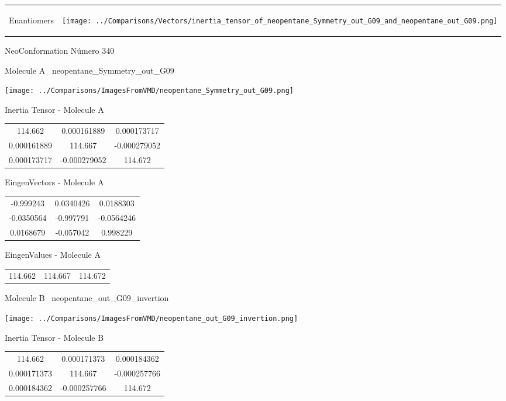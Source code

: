 \vtab[-5mm]
\begin{tabular}{*{2}{m{}}}
\begin{center}
\textcolor{NavyBlue}{\Large Enantiomers}
\end{center}
&
\begin{center}
\texttt{[image: ../Comparisons/Vectors/inertia\_tensor\_of\_neopentane\_Symmetry\_out\_G09\_and\_neopentane\_out\_G09.png]}
\end{center}
\end{tabular}

 \newpage

\vtab[-3cm]
\begin{center}
{\large NeoConformation \tab Número 340}
\end{center}
\begin{multicols}{2}
\begin{center}

Molecule A \
neopentane\_Symmetry\_out\_G09

\texttt{[image: ../Comparisons/ImagesFromVMD/neopentane\_Symmetry\_out\_G09.png]}

Inertia Tensor - Molecule A \\
\begin{tabular}{|c c c|}
114.662	 & 	0.000161889	 & 	0.000173717	 \\
0.000161889	 & 	114.667	 & 	-0.000279052	 \\
0.000173717	 & 	-0.000279052	 & 	114.672
\end{tabular}

\vtab
 EingenVectors - Molecule A     \\
\begin{tabular}{|c c c|}
-0.999243	 & 	0.0340426	 & 	0.0188303	 \\
-0.0350564	 & 	-0.997791	 & 	-0.0564246	 \\
0.0168679	 & 	-0.057042	 & 	0.998229
\end{tabular}

\vtab
 EingenValues - Molecule A     \\
\begin{tabular}{|c c c|}
114.662	 & 	114.667	 & 	114.672	 \\
\end{tabular}
\columnbreak

Molecule B \
neopentane\_out\_G09\_invertion

\texttt{[image: ../Comparisons/ImagesFromVMD/neopentane\_out\_G09\_invertion.png]}

Inertia Tensor - Molecule B \\
\begin{tabular}{|c c c|}
114.662	 & 	0.000171373	 & 	0.000184362	 \\
0.000171373	 & 	114.667	 & 	-0.000257766	 \\
0.000184362	 & 	-0.000257766	 & 	114.672
\end{tabular}


\end{center}
\end{multicols}
